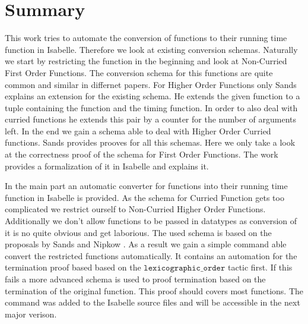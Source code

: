 
\chapter{Summary}\label{chapter:summary}

This work tries to automate the conversion of functions to their running time function in Isabelle.
Therefore we look at existing conversion schemas.
Naturally we start by restricting the function in the beginning and look at Non-Curried First Order Functions.
The conversion schema for this functions are quite common and similar in differnet papers.
For Higher Order Functions only Sands explains an extension for the existing schema.
He extends the given function to a tuple containing the function and the timing function.
In order to also deal with curried functions he extends this pair by a counter for the number of arguments left.
In the end we gain a schema able to deal with Higher Order Curried functions.
Sands provides prooves for all this schemas.
Here we only take a look at the correctness proof of the schema for First Order Functions.
The work provides a formalization of it in Isabelle and explains it.

In the main part an automatic converter for functions into their running time function in Isabelle is provided.
As the schema for Curried Function gets too complicated we restrict ourself to Non-Curried Higher Order Functions.
Additionally we don't allow functions to be passed in datatypes as conversion of it is no quite obvious and get laborious.
The used schema is based on the proposals by Sands \parencite{sands} and Nipkow \parencite{fds}.
As a result we gain a simple command able convert the restricted functions automatically.
It contains an automation for the termination proof based based on the $\texttt{lexicographic\_order}$ tactic first.
If this fails a more advanced schema is used to proof termination based on the termination of the original function.
This proof should covers most functions.
The command was added to the Isabelle source files and will be accessible in the next major verison.
